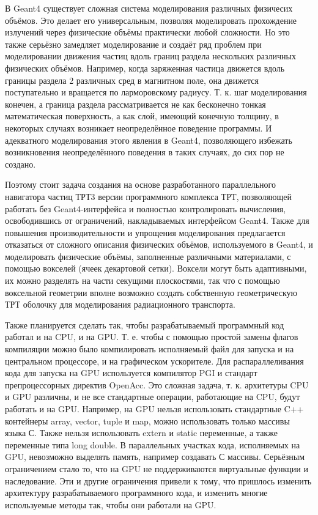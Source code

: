 \documentclass[a4paper,12pt]{article}
\begin{document}
\begin{large}
    В Geant4 существует сложная система моделирования различных физичесих объёмов.
    Это делает его универсальным, позволяя моделировать прохождение излучений через физические объёмы практически любой сложности.
    Но это также серьёзно замедляет моделирование и создаёт ряд проблем при моделировании движения частиц вдоль границ раздела нескольких различных физических объёмов.
    Например, когда заряженная частица движется вдоль границы раздела 2 различных сред в магнитном поле, она движется поступательно и вращается по ларморовскому радиусу.
    Т. к. шаг моделирования конечен, а граница раздела рассматривается не как бесконечно тонкая математическая поверхность, а как слой, имеющий конечную толщину, в некоторых случаях возникает неопределённое поведение программы.
    И адекватного моделирования этого явления в Geant4, позволяющего избежать возникновения неопределённого поведения в таких случаях, до сих пор не создано.
    
    Поэтому стоит задача создания на основе разработанного параллельного навигатора частиц ТРТ3 версии программного комплекса ТРТ, позволяющей работать без Geant4-интерфейса и полностью контролировать вычисления, освободившись от ограничений, накладываемых интерфейсом Geant4.
    Также для повышения производительности и упрощения моделирования предлагается отказаться от сложного описания физических объёмов, используемого в Geant4, и моделировать физические объёмы, заполненные различными материалами, с помощью вокселей (ячеек декартовой сетки).
    Воксели могут быть адаптивными, их можно разделять на части секущими плоскостями, так что с помощью воксельной геометрии вполне возможно создать собственную геометрическую ТРТ оболочку для моделирования радиационного транспорта.
    
    Также планируется сделать так, чтобы разрабатываемый программный код работал и на CPU, и на GPU.
    Т. е. чтобы с помощью простой замены флагов компиляции можно было компилировать исполняемый файл для запуска и на центральном процессоре, и на графическом ускорителе.
    Для распараллеливания кода для запуска на GPU используется компилятор PGI и стандарт препроцессорных директив OpenAcc.
    Это сложная задача, т. к. архитетуры CPU и GPU различны, и не все стандартные операции, работающие на CPU, будут работать и на GPU.
    Например, на GPU нельзя использовать стандартные C++ контейнеры array, vector, tuple и map, можно использовать только массивы языка С.
    Также нельзя использовать extern и static переменные, а также переменные типа long double.
    В параллельных участках кода, исполняемых на GPU, невозможно выделять память, например создавать С массивы.
    Серьёзным ограничением стало то, что на GPU не поддерживаются виртуальные функции и наследование. 		Эти и другие ограничения привели к тому, что пришлось изменить архитектуру разрабатываемого программного кода, и изменить многие используемые методы так, чтобы они работали на GPU.
    

\end{large}
\end{document}
